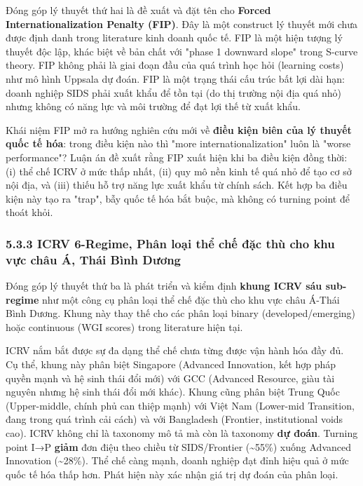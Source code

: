 \documentclass[12pt,a4paper]{article}
\begin{document}
Đóng góp lý thuyết thứ hai là đề xuất và đặt tên cho \textbf{Forced
Internationalization Penalty (FIP)}. Đây là một construct lý thuyết mới
chưa được định danh trong literature kinh doanh quốc tế. FIP là một hiện
tượng lý thuyết độc lập, khác biệt về bản chất với "phase 1 downward
slope" trong S-curve theory. FIP không phải là giai đoạn đầu của quá
trình học hỏi (learning costs) như mô hình Uppsala dự đoán. FIP là một
trạng thái cấu trúc bất lợi dài hạn: doanh nghiệp SIDS phải xuất khẩu để
tồn tại (do thị trường nội địa quá nhỏ) nhưng không có năng lực và môi
trường để đạt lợi thế từ xuất khẩu.

Khái niệm FIP mở ra hướng nghiên cứu mới về \textbf{điều kiện biên của
lý thuyết quốc tế hóa}: trong điều kiện nào thì "more
internationalization" luôn là "worse performance"? Luận án đề xuất rằng
FIP xuất hiện khi ba điều kiện đồng thời: (i) thể chế ICRV ở mức thấp
nhất, (ii) quy mô nền kinh tế quá nhỏ để tạo cơ sở nội địa, và (iii)
thiếu hỗ trợ năng lực xuất khẩu từ chính sách. Kết hợp ba điều kiện này
tạo ra "trap", bẫy quốc tế hóa bắt buộc, mà không có turning point để
thoát khỏi.

\hypertarget{533-icrv-6-regime-phuxe2n-loux1ea1i-thux1ec3-chux1ebf-ux111ux1eb7c-thuxf9-cho-khu-vux1ef1c-chuxe2u-uxe1-thuxe1i-buxecnh-dux1b0ux1a1ng}{%
\subsubsection{5.3.3 ICRV 6-Regime, Phân loại thể chế đặc thù cho khu
vực châu Á, Thái Bình
Dương}\label{533-icrv-6-regime-phuxe2n-loux1ea1i-thux1ec3-chux1ebf-ux111ux1eb7c-thuxf9-cho-khu-vux1ef1c-chuxe2u-uxe1-thuxe1i-buxecnh-dux1b0ux1a1ng}}

Đóng góp lý thuyết thứ ba là phát triển và kiểm định \textbf{khung ICRV
sáu sub-regime} như một công cụ phân loại thể chế đặc thù cho khu vực
châu Á-Thái Bình Dương. Khung này thay thế cho các phân loại binary
(developed/emerging) hoặc continuous (WGI scores) trong literature hiện
tại.

ICRV nắm bắt được sự đa dạng thể chế chưa từng được vận hành hóa đầy đủ.
Cụ thể, khung này phân biệt Singapore (Advanced Innovation, kết hợp pháp
quyền mạnh và hệ sinh thái đổi mới) với GCC (Advanced Resource, giàu tài
nguyên nhưng hệ sinh thái đổi mới khác). Khung cũng phân biệt Trung Quốc
(Upper-middle, chính phủ can thiệp mạnh) với Việt Nam (Lower-mid
Transition, đang trong quá trình cải cách) và với Bangladesh (Frontier,
institutional voids cao). ICRV không chỉ là taxonomy mô tả mà còn là
taxonomy \textbf{dự đoán}. Turning point I→P \textbf{giảm} đơn điệu theo
chiều từ SIDS/Frontier (\textasciitilde55\%) xuống Advanced Innovation
(\textasciitilde28\%). Thể chế càng mạnh, doanh nghiệp đạt đỉnh hiệu quả
ở mức quốc tế hóa thấp hơn. Phát hiện này xác nhận giá trị dự đoán của
phân loại.
\end{document}
